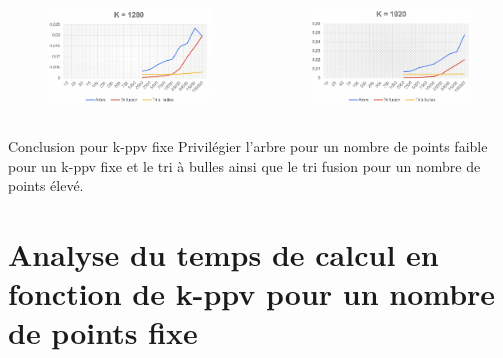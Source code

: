 \documentclass{beamer}
\begin{document}
\begin{frame}
\begin{columns}
    \begin{figure}
      \includegraphics[width=\textwidth]{Beamer/K_1280.png}
    \end{figure}

    \begin{figure}
      \includegraphics[width=\textwidth]{Beamer/K_1920.png}
    \end{figure}
\end{columns}

\begin{block}{Conclusion pour k-ppv fixe}
Privilégier l'arbre pour un nombre de points faible pour un k-ppv fixe et le tri à bulles ainsi que le tri fusion pour un nombre de points élevé.
\end{block}
\end{frame}

\section{Analyse du temps de calcul en fonction de k-ppv pour un nombre de points fixe}
\end{document}
